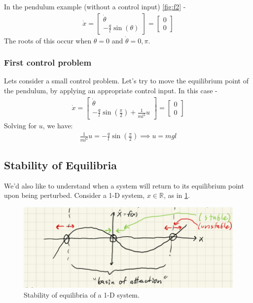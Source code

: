 In the pendulum example (without a control input) \cref{fig:f2} - 
\begin{align}
    \dot{x} = \begin{bmatrix}
        \dot{\theta} \\
        -\frac{q}{l} \sin(\theta) 
    \end{bmatrix}
    = 
    \begin{bmatrix}
        0 \\
        0
    \end{bmatrix}
\end{align}
The roots of this occur when $\theta=0$ and $\dot{\theta}=0, \pi$.

\subsubsection{First control problem}
Lets consider a small control problem. Let's try to move the equilibrium point of the pendulum, by applying an appropriate control input. In this case - 
\begin{align}
    \dot{x} = \begin{bmatrix}
        \dot{\theta} \\
        - \frac{q}{l} \sin(\frac{\pi}{2}) + \frac{1}{ml^2} u 
    \end{bmatrix}
    =
    \begin{bmatrix}
        0 \\
        0
    \end{bmatrix}
\end{align}
Solving for $u$, we have:
\begin{align}
    \frac{1}{ml^2} u = - \frac{q}{l} \sin (\frac{\pi}{2}) 
    \implies u = mgl
\end{align}

\subsection{Stability of Equilibria}
We'd also like to understand when a system will return to its equilibrium point upon being perturbed.
Consider a 1-D system, $x \in \mathbb{R}$, as in \cref{fig:f3}.\\

\begin{figure}
    \centering
    \includegraphics[width=\linewidth]{L1_Images/F3.PNG}
    \caption{Stability of equilibria of a 1-D system.}
    \label{fig:f3}
\end{figure}


